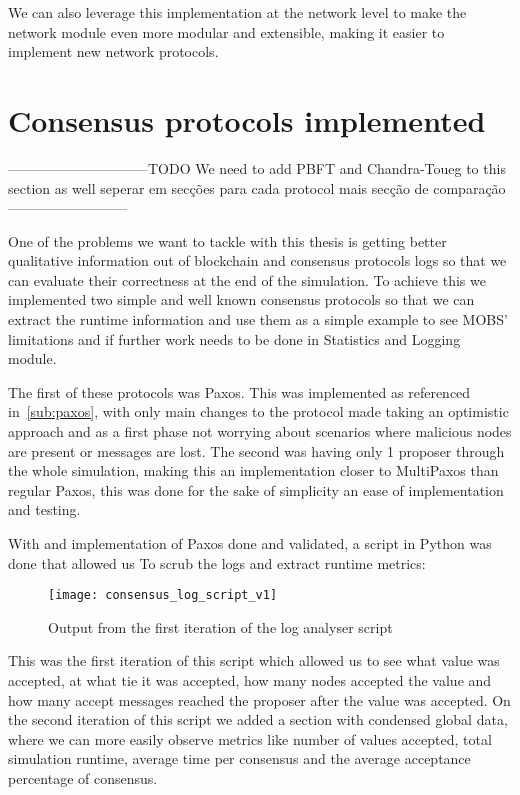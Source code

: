 We can also leverage this implementation at the network level to make the network
module even more modular and extensible, making it easier to implement new network protocols.

\section{Consensus protocols implemented}\label{sub:consensus_protocols_implemented}

------------------------------TODO We need to add PBFT  and Chandra-Toueg to this section as well seperar em secções para cada protocol mais secção de comparação--------------------------





One of the problems we want to tackle with this thesis is getting better qualitative information out of
blockchain and consensus protocols logs so that we can evaluate their correctness at the end 
of the simulation. To achieve this we implemented two simple and well known consensus protocols
so that we can extract the runtime information and use them as a simple example to see MOBS' limitations
and if further work needs to be done in Statistics and Logging module.

The first of these protocols was Paxos. This was implemented as referenced in~\ref{sub:paxos},
with only main changes to the protocol made taking an optimistic approach and as a first phase
not worrying about scenarios where malicious nodes are present or messages are lost. The second was
having only 1 proposer through the whole simulation, making this an implementation closer to MultiPaxos
than regular Paxos, this was done for the sake of simplicity an ease of implementation and testing.

With and implementation of Paxos done and validated, a script in Python was done that allowed us To
scrub the logs and extract runtime metrics:

\begin{figure}[h]
	\centering
	\texttt{[image: consensus\_log\_script\_v1]}
	\caption{Output from the first iteration of the log analyser script}
	\label{fig:consensus_log_script_v1}
\end{figure}

This was the first iteration of this script which allowed us to see what value was accepted,
at what tie it was accepted, how many nodes accepted the value and how many accept messages
reached the proposer after the value was accepted. 
On the second iteration of this script we added a section with condensed global data, where we can more
easily observe metrics like number of values accepted, total simulation runtime, average time per consensus
and the average acceptance percentage of consensus. 

